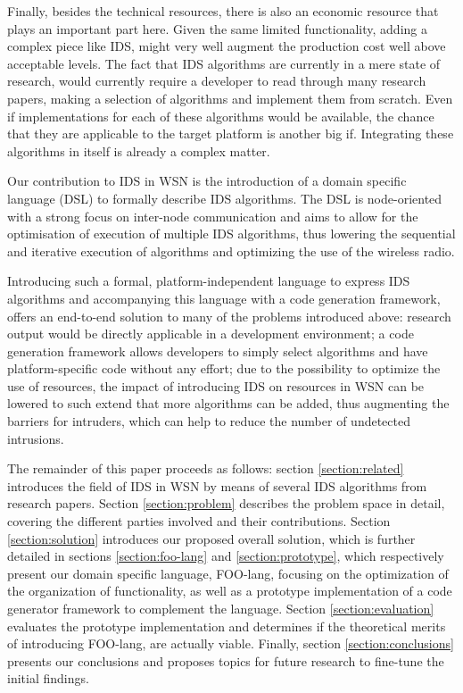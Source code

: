 \documentclass[conference]{IEEEtran}
\begin{document}
Finally, besides the technical resources, there is also an economic resource
that plays an important part here. Given the same limited functionality, adding
a complex piece like IDS, might very well augment the production cost well
above acceptable levels. The fact that IDS algorithms are currently in a mere
state of research, would currently require a developer to read through many
research papers, making a selection of algorithms and implement them from
scratch. Even if implementations for each of these algorithms would be
available, the chance that they are applicable to the target platform is
another big if. Integrating these algorithms in itself is already a complex
matter.

Our contribution to IDS in WSN is the introduction of a domain specific
language (DSL) to formally describe IDS algorithms. The DSL is node-oriented
with a strong focus on inter-node communication and aims to allow for the
optimisation of execution of multiple IDS algorithms, thus lowering the
sequential and iterative execution of algorithms and optimizing the use of the
wireless radio.

Introducing such a formal, platform-independent language to express IDS
algorithms and accompanying this language with a code generation framework,
offers an end-to-end solution to many of the problems introduced above:
research output would be directly applicable in a development environment; a
code generation framework allows developers to simply select algorithms and
have platform-specific code without any effort; due to the possibility to
optimize the use of resources, the impact of introducing IDS on resources in
WSN can be lowered to such extend that more algorithms can be added, thus
augmenting the barriers for intruders, which can help to reduce the number of
undetected intrusions.

The remainder of this paper proceeds as follows: section \ref{section:related}
introduces the field of IDS in WSN by means of several IDS algorithms from
research papers. Section \ref{section:problem} describes the problem space in
detail, covering the different parties involved and their contributions.
Section \ref{section:solution} introduces our proposed overall solution, which
is further detailed in sections \ref{section:foo-lang} and
\ref{section:prototype}, which respectively present our domain specific
language, FOO-lang, focusing on the optimization of the organization of
functionality, as well as a prototype implementation of a code generator
framework to complement the language. Section \ref{section:evaluation}
evaluates the prototype implementation and determines if the theoretical merits
of introducing FOO-lang, are actually viable. Finally, section
\ref{section:conclusions} presents our conclusions and proposes topics for
future research to fine-tune the initial findings.
\end{document}

